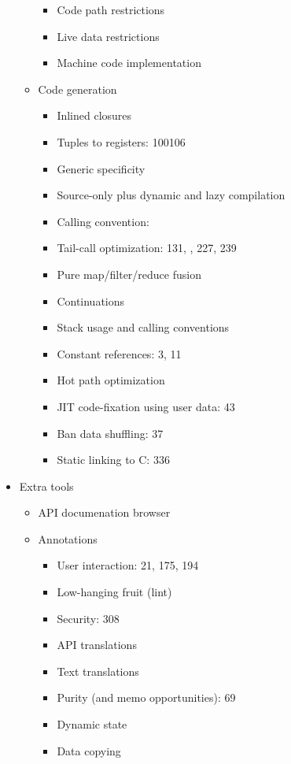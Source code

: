 \begin{itemize}
\begin{itemize}
    \begin{itemize}
    \item Code path restrictions
    \item Live data restrictions
    \item Machine code implementation
    \end{itemize}
  \item Code generation
    \begin{itemize}
    \item Inlined closures
    \item Tuples to registers: 100106
    \item Generic specificity
    \item Source-only plus dynamic and lazy compilation
    \item Calling convention: \cite{LTUG}
    \item Tail-call optimization: 131, \cite{LTUG}, 227, 239
    \item Pure map/filter/reduce fusion
    \item Continuations
    \item Stack usage and calling conventions
    \item Constant references: 3, 11
    \item Hot path optimization
    \item JIT code-fixation using user data: 43
    \item Ban data shuffling: 37
    \item Static linking to C: 336
    \end{itemize}
  \end{itemize}
\item Extra tools
  \begin{itemize}
  \item API documenation browser
  \item Annotations
    \begin{itemize}
    \item User interaction: 21, 175, 194
    \item Low-hanging fruit (lint)
    \item Security: 308
    \item API translations
    \item Text translations
    \item Purity (and memo opportunities): 69
    \item Dynamic state
    \item Data copying

\end{itemize}
\end{itemize}
\end{itemize}

